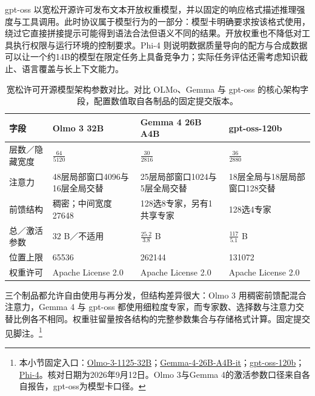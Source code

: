 \documentclass[../textbook.tex]{subfiles}
\begin{document}
gpt-oss 以宽松开源许可发布文本开放权重模型，并以固定的响应格式描述推理强度与工具调用\cite{openai2025gptoss}。此时协议属于模型行为的一部分：模型卡明确要求按该格式使用，绕过它直接拼接提示可能得到语法合法但语义不同的结果。开放权重也不降低对工具执行权限与运行环境的控制要求。Phi-4 则说明数据质量导向的配方与合成数据可以让一个约14B的模型在限定任务上具备竞争力\cite{microsoft2024phi4}；实际任务评估还需考虑知识截止、语言覆盖与长上下文能力。

\begin{table}[htbp]
\centering
\small
\caption[宽松许可开源模型架构参数对比]{宽松许可开源模型架构参数对比。对比 OLMo、Gemma 与 gpt-oss 的核心架构字段，配置数值取自各制品的固定提交版本。}\label{tab:open-permissive-comparison}
\begin{tabularx}{\linewidth}{p{24mm}XXX}
\toprule 字段 & Olmo 3 32B & Gemma 4 26B A4B & gpt-oss-120b\\\midrule
层数／隐藏宽度 & $\frac{64}{5120}$ & $\frac{30}{2816}$ & $\frac{36}{2880}$\\
注意力 & 48层局部窗口4096与16层全局交替 & 25层局部窗口1024与5层全局交替 & 18层全局与18层局部窗口128交替\\
前馈结构 & 稠密；中间宽度27648 & 128选8专家，另有1共享专家 & 128选4专家\\
总／激活参数 & $32$ B／不适用 & $\frac{25.2}{3.8}$ B & $\frac{117}{5.1}$ B\\
位置上限 & 65536 & 262144 & 131072\\
权重许可 & Apache License 2.0 & Apache License 2.0 & Apache License 2.0\\
\bottomrule
\end{tabularx}
\end{table}

三个制品都允许自由使用与再分发，但结构差异很大：Olmo 3 用稠密前馈配混合注意力，Gemma 4 与 gpt-oss 都使用细粒度专家，而专家数、选择数与注意力交替比例各不相同。权重驻留量按各结构的完整参数集合与存储格式计算。固定提交见脚注。\footnote{本小节固定入口：\href{https://huggingface.co/allenai/Olmo-3-1125-32B/tree/c2b61dae89a1ad10e4ad5653d0e46b590902607b}{Olmo-3-1125-32B}；\href{https://huggingface.co/google/gemma-4-26B-A4B-it/tree/4d7ae4984b7db7de8f8457170b3f1a419ee76d52}{Gemma-4-26B-A4B-it}；\href{https://huggingface.co/openai/gpt-oss-120b/tree/b5c939de8f754692c1647ca79fbf85e8c1e70f8a}{gpt-oss-120b}；\href{https://huggingface.co/microsoft/phi-4/tree/2db69c1c3e91a05d2c64a3185acfbaf36f744e25}{Phi-4}。核对日期为2026年9月12日。Olmo 3与Gemma 4的激活参数口径来自各自报告，gpt-oss为模型卡口径。}
\end{document}
